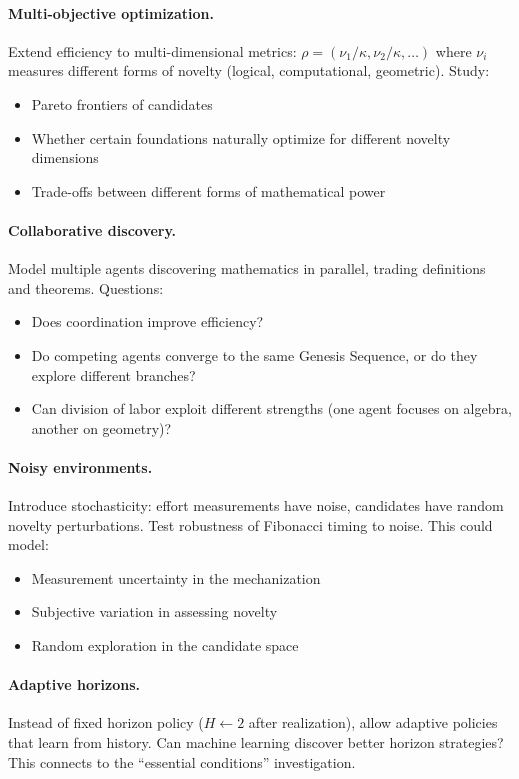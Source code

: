 \documentclass[11pt]{article}
\theoremstyle{definition}
\theoremstyle{remark}
\begin{document}
\paragraph{Multi-objective optimization.}
Extend efficiency to multi-dimensional metrics: $\rho = (\nu_1/\kappa, \nu_2/\kappa, \ldots)$ where $\nu_i$ measures
different forms of novelty (logical, computational, geometric). Study:
\begin{itemize}
\item Pareto frontiers of candidates
\item Whether certain foundations naturally optimize for different novelty dimensions
\item Trade-offs between different forms of mathematical power
\end{itemize}

\paragraph{Collaborative discovery.}
Model multiple agents discovering mathematics in parallel, trading definitions and theorems. Questions:
\begin{itemize}
\item Does coordination improve efficiency?
\item Do competing agents converge to the same Genesis Sequence, or do they explore different
branches?
\item Can division of labor exploit different strengths (one agent focuses on algebra, another on
geometry)?
\end{itemize}

\paragraph{Noisy environments.}
Introduce stochasticity: effort measurements have noise, candidates have random novelty perturbations.
Test robustness of Fibonacci timing to noise. This could model:
\begin{itemize}
\item Measurement uncertainty in the mechanization
\item Subjective variation in assessing novelty
\item Random exploration in the candidate space
\end{itemize}

\paragraph{Adaptive horizons.}
Instead of fixed horizon policy ($H \gets 2$ after realization), allow adaptive policies that learn from
history. Can machine learning discover better horizon strategies? This connects to the ``essential
conditions'' investigation.
\end{document}
